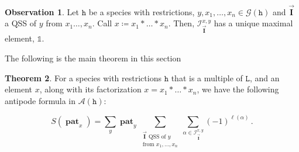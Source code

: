 \documentclass[12pt, reqno]{amsart}
\theoremstyle{definition}
\newtheorem{thm}{Theorem}[section]
\newtheorem{obs}[thm]{Observation}
\newcommand{\III}{\vec{\mathbf{I}}}
\DeclareMathOperator{\pat}{\mathbf{pat}}
\begin{document}
\


\begin{obs}
Let $\mathtt{h}$ be a species with restrictions, $y, x_1, \dots, x_n \in \mathcal G(\mathtt{h})$ and $\III$ a QSS of $y$ from $x_1\dots, x_n$.
Call $x \coloneqq x_1 \ast \dots \ast x_n$.
Then, $\mathcal I^{x, y}_{\III}$ has a unique maximal element, $\mathbb{1}$.
\end{obs}

The following is the main theorem in this section

\begin{thm}\label{thm:general_antipode}
For a species with restrictions $\mathtt{h}$ that is a multiple of $\mathtt{L}$, and an element $x$, along with its factorization $x=x_1 \ast \dots \ast x_n$, we have the following antipode formula in $\mathcal A (\mathtt{h})$:

$$S(\pat_x) = \sum_y \pat_y \sum_{\substack{\III \text{ QSS of $y$}\\ \text{from }x_1, \dots , x_n}}  \sum_{\alpha \in \mathcal I^{x, y}_{\III}} (-1)^{\ell ( \alpha)} \, .$$
\end{thm}
\end{document}

